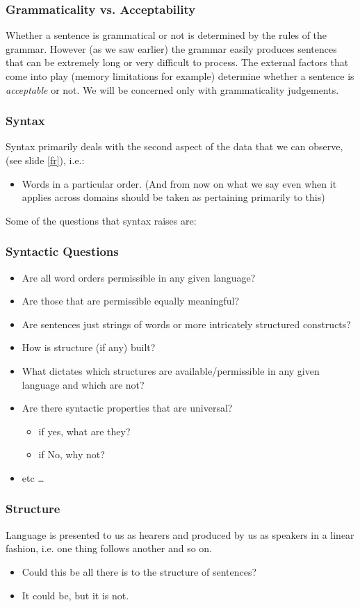 \begin{frame}
  \frametitle{Grammaticality vs. Acceptability}

Whether a sentence is grammatical or not is determined by the rules of the grammar.  However (as we saw earlier) the grammar easily produces sentences that can be extremely long or very difficult to process.  The external factors that come into play (memory limitations for example) determine whether a sentence is \textit{acceptable} or not.  We will be concerned only with grammaticality judgements.
\end{frame}

\begin{frame}
\frametitle{Syntax}
 Syntax primarily deals with the second aspect of the data that we can observe,(see slide \ref{fr}), i.e.:
\begin{itemize}
\item Words in a particular order. (And from now on what we say even when it applies across domains should be taken as pertaining primarily to this)
\end{itemize}

Some of the questions that syntax raises are:
\end{frame}

\begin{frame}
  \frametitle{Syntactic Questions}

  \begin{itemize}
  \item Are all word orders permissible in any given language?
  \item Are those that are permissible equally meaningful?
  \item Are sentences just strings of words or more intricately structured constructs?
  \item How is structure (if any) built?
  \item What dictates which structures are available/permissible in any given language and which are not?
\item Are there syntactic properties that are universal?
\begin{itemize}
\item if yes, what are they?
\item if No, why not?
  \end{itemize}
\item  etc \dots
\end{itemize}
\end{frame}

\begin{frame}
  \frametitle{Structure}

Language is presented to us as hearers and produced by us as speakers in a linear fashion, i.e. one thing follows another and so on.

\pause
\begin{itemize}
\item Could this be all there is to the structure of sentences?
\pause
\item It could be, but it is not.
\end{itemize}

\end{frame}

